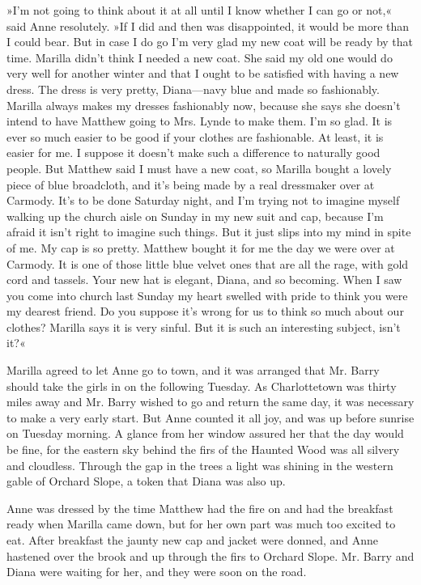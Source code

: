 »I'm not going to think about it at all until I know whether I can go or not,« said Anne resolutely. »If I did and then was disappointed, it would be more than I could bear. But in case I do go I'm very glad my new coat will be ready by that time. Marilla didn't think I needed a new coat. She said my old one would do very well for another winter and that I ought to be satisfied with having a new dress. The dress is very pretty, Diana—navy blue and made so fashionably. Marilla always makes my dresses fashionably now, because she says she doesn't intend to have Matthew going to Mrs. Lynde to make them. I'm so glad. It is ever so much easier to be good if your clothes are fashionable. At least, it is easier for me. I suppose it doesn't make such a difference to naturally good people. But Matthew said I must have a new coat, so Marilla bought a lovely piece of blue broadcloth, and it's being made by a real dressmaker over at Carmody. It's to be done Saturday night, and I'm trying not to imagine myself walking up the church aisle on Sunday in my new suit and cap, because I'm afraid it isn't right to imagine such things. But it just slips into my mind in spite of me. My cap is so pretty. Matthew bought it for me the day we were over at Carmody. It is one of those little blue velvet ones that are all the rage, with gold cord and tassels. Your new hat is elegant, Diana, and so becoming. When I saw you come into church last Sunday my heart swelled with pride to think you were my dearest friend. Do you suppose it's wrong for us to think so much about our clothes? Marilla says it is very sinful. But it is such an interesting subject, isn't it?«

Marilla agreed to let Anne go to town, and it was arranged that Mr. Barry should take the girls in on the following Tuesday. As Charlottetown was thirty miles away and Mr. Barry wished to go and return the same day, it was necessary to make a very early start. But Anne counted it all joy, and was up before sunrise on Tuesday morning. A glance from her window assured her that the day would be fine, for the eastern sky behind the firs of the Haunted Wood was all silvery and cloudless. Through the gap in the trees a light was shining in the western gable of Orchard Slope, a token that Diana was also up.

Anne was dressed by the time Matthew had the fire on and had the breakfast ready when Marilla came down, but for her own part was much too excited to eat. After breakfast the jaunty new cap and jacket were donned, and Anne hastened over the brook and up through the firs to Orchard Slope. Mr. Barry and Diana were waiting for her, and they were soon on the road.

